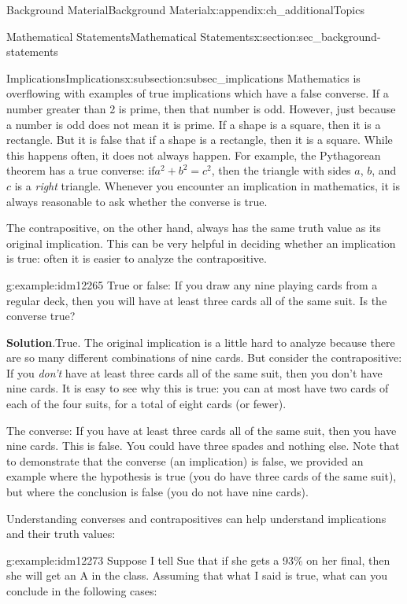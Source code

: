\documentclass[oneside,10pt,]{book}
\numberwithin{equation}{chapter}
\begin{document}
\begin{appendixptx}{Background Material}{}{Background Material}{}{}{x:appendix:ch_additionalTopics}
\begin{sectionptx}{Mathematical Statements}{}{Mathematical Statements}{}{}{x:section:sec_background-statements}
\begin{subsectionptx}{Implications}{}{Implications}{}{}{x:subsection:subsec_implications}
Mathematics is overflowing with examples of true implications which have a false converse. If a number greater than 2 is prime, then that number is odd. However, just because a number is odd does not mean it is prime. If a shape is a square, then it is a rectangle. But it is false that if a shape is a rectangle, then it is a square. While this happens often, it does not always happen. For example, the Pythagorean theorem has a true converse: if\(a^2 + b^2 = c^2\), then the triangle with sides \(a\), \(b\), and \(c\) is a \emph{right} triangle. Whenever you encounter an implication in mathematics, it is always reasonable to ask whether the converse is true.%
\par
The contrapositive, on the other hand, always has the same truth value as its original implication. This can be very helpful in deciding whether an implication is true: often it is easier to analyze the contrapositive.%
\begin{example}{}{g:example:idm12265}%
True or false: If you draw any nine playing cards from a regular deck, then you will have at least three cards all of the same suit. Is the converse true?%
\par\smallskip%
\noindent\textbf{Solution}.\hypertarget{g:solution:idm12268}{}\quad{}True. The original implication is a little hard to analyze because there are so many different combinations of nine cards. But consider the contrapositive: If you \emph{don't} have at least three cards all of the same suit, then you don't have nine cards. It is easy to see why this is true: you can at most have two cards of each of the four suits, for a total of eight cards (or fewer).%
\par
The converse: If you have at least three cards all of the same suit, then you have nine cards. This is false. You could have three spades and nothing else. Note that to demonstrate that the converse (an implication) is false, we provided an example where the hypothesis is true (you do have three cards of the same suit), but where the conclusion is false (you do not have nine cards).%
\end{example}
Understanding converses and contrapositives can help understand implications and their truth values:%
\begin{example}{}{g:example:idm12273}%
Suppose I tell Sue that if she gets a 93\% on her final, then she will get an A in the class. Assuming that what I said is true, what can you conclude in the following cases:%
\par
%
\begin{enumerate}

\end{enumerate}
\end{example}
\end{subsectionptx}
\end{sectionptx}
\end{appendixptx}
\end{document}
